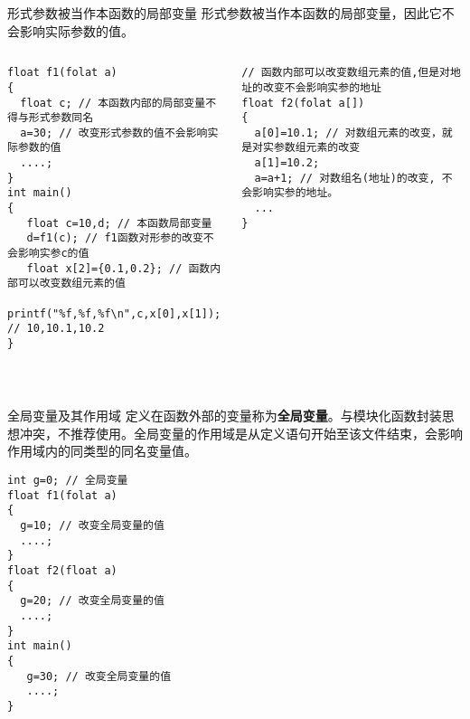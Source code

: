 \begin{frame}{形式参数被当作本函数的局部变量}
形式参数被当作本函数的局部变量，因此它不会影响实际参数的值。
\begin{columns}[T]
\begin{lstlisting}
float f1(folat a) 
{
  float c; // 本函数内部的局部变量不得与形式参数同名
  a=30; // 改变形式参数的值不会影响实际参数的值
  ....;
}
int main()
{
   float c=10,d; // 本函数局部变量
   d=f1(c); // f1函数对形参的改变不会影响实参c的值
   float x[2]={0.1,0.2}; // 函数内部可以改变数组元素的值
   printf("%f,%f,%f\n",c,x[0],x[1]); // 10,10.1,10.2  
}
\end{lstlisting}
\begin{lstlisting}
// 函数内部可以改变数组元素的值,但是对地址的改变不会影响实参的地址
float f2(folat a[]) 
{
  a[0]=10.1; // 对数组元素的改变，就是对实参数组元素的改变
  a[1]=10.2;
  a=a+1; // 对数组名(地址)的改变, 不会影响实参的地址。
  ...
}
\end{lstlisting}
\end{columns}
~\\
\end{frame}

\begin{frame}{全局变量及其作用域}
定义在函数外部的变量称为\textbf{全局变量}。与模块化函数封装思想冲突，不推荐使用。全局变量的作用域是从定义语句开始至该文件结束，会影响作用域内的同类型的同名变量值。 
\begin{lstlisting}
int g=0; // 全局变量
float f1(folat a) 
{
  g=10; // 改变全局变量的值
  ....;
}
float f2(float a)
{ 
  g=20; // 改变全局变量的值
  ....;
}
int main()
{
   g=30; // 改变全局变量的值
   ....;
}
\end{lstlisting}
\end{frame}




